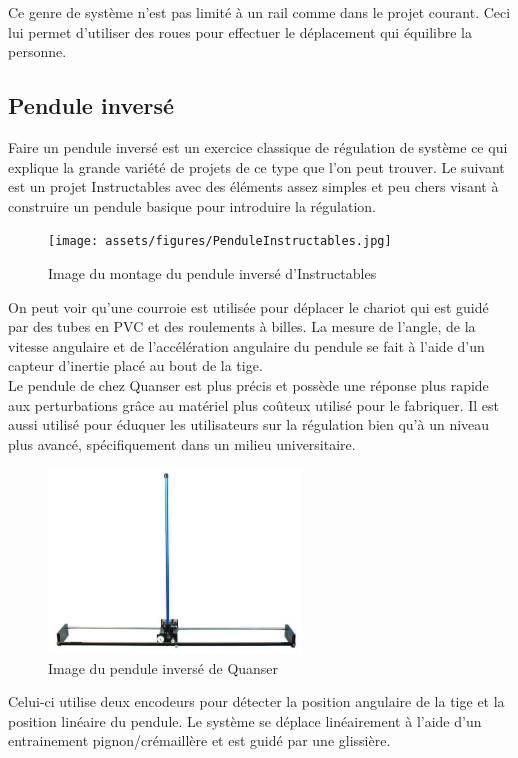 Ce genre de système n'est pas limité à un rail comme dans le projet courant. Ceci lui permet d'utiliser des roues pour effectuer le déplacement qui équilibre la personne.

\subsection{Pendule inversé}

Faire un pendule inversé est un exercice classique de régulation de système ce qui explique la grande variété de projets de ce type que l'on peut trouver.
Le suivant est un projet Instructables avec des éléments assez simples et peu chers visant à construire un pendule basique pour introduire la régulation.

\begin{figure}[H]
    \centering
    \texttt{[image: assets/figures/PenduleInstructables.jpg]}
    \caption{Image du montage du pendule inversé d'Instructables \cite{Instructables}}
    \label{fig:Instructables}
\end{figure}

On peut voir qu'une courroie est utilisée pour déplacer le chariot qui est guidé par des tubes en PVC et des roulements à billes. La mesure de l'angle, de la vitesse angulaire et de l'accélération angulaire du pendule se fait à l'aide d'un capteur d'inertie placé au bout de la tige.\\

Le pendule de chez Quanser est plus précis et possède une réponse plus rapide aux perturbations grâce au matériel plus coûteux utilisé pour le fabriquer. Il est aussi utilisé pour éduquer les utilisateurs sur la régulation bien qu'à un niveau plus avancé, spécifiquement dans un milieu universitaire.

\begin{figure}[H]
    \centering
    \includegraphics[width = 0.6\textwidth]{assets/figures/PenduleQuanser.png}
    \caption{Image du pendule inversé de Quanser \cite{Quanser}}
    \label{fig:Quanser}
\end{figure}

Celui-ci utilise deux encodeurs pour détecter la position angulaire de la tige et la position linéaire du pendule. Le système se déplace linéairement à l'aide d'un entrainement pignon/crémaillère et est guidé par une glissière.